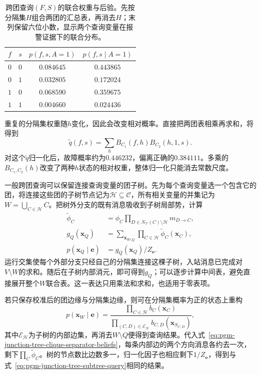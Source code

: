 \begin{table}[htbp]
  \centering
  \begin{tabular}{cccc}
    \toprule
    $f$ & $s$ & $p(f,s,A=1)$ & $p(f,s\mid A=1)$\\
    \midrule
    $0$ & $0$ & $0.084645$ & $0.443865$\\
    $0$ & $1$ & $0.032805$ & $0.172024$\\
    $1$ & $0$ & $0.068590$ & $0.359675$\\
    $1$ & $1$ & $0.004660$ & $0.024436$\\
    \bottomrule
  \end{tabular}
  \caption{跨团查询$(F,S)$的联合权重与后验。先按分隔集$H$组合两团的汇总表，再消去$H$；末列保留六位小数，显示两个查询变量在报警证据下的联合分布。}
  \label{tab:pgm-junction-tree-cross-query}
\end{table}

重复的分隔集权重随$h$变化，因此会改变相对概率。直接把两团表相乘再求和，将得到
\[
  \widetilde{q}(f,s)=\sum_h B_{C_1}(f,h)B_{C_2}(h,1,s).
\]
对这个$\widetilde q$归一化后，故障概率约为$0.446232$，偏离正确的$0.384111$。多乘的$B_{C_1,C_2}(h)$改变了两种$h$状态的相对权重，整体归一化只能消去常数尺度。

一般跨团查询可以保留连接查询变量的团子树。先为每个查询变量选一个包含它的团，将连接这些团的子树节点记为$\mathcal H\subseteq\mathcal C$，所有相关变量的并集记为$W=\bigcup_{C\in\mathcal H}C$。把树外分支的既有消息吸收到子树局部势，计算
\begin{equation}
  \begin{aligned}
    \widetilde{\phi}_C
      &=\phi_C
        \prod_{D\in N_{\mathcal{T}}(C)\setminus\mathcal{H}}m_{D\to C},\\
    g_Q(\bm{x}_Q)
      &=\sum_{\bm{x}_{W\setminus Q}}
         \prod_{C\in\mathcal{H}}\widetilde{\phi}_C(\bm{x}_C),\\
    p(\bm{x}_Q\mid\bm{e})&=g_Q(\bm{x}_Q)/Z_{\bm{e}}.
  \end{aligned}
  \label{eq:pgm-junction-tree-subtree-query}
\end{equation}
运行交集使每个外部分支只经自己的分隔集连接这棵子树，入站消息已完成对$V\setminus W$的求和。随后在子树内部消元，即可得到$g_Q$；可以逐步计算中间表，避免直接展开整个$W$联合表。这一表达只用乘法和求和，也适用于零表项。

若只保存校准后的团边缘与分隔集边缘，则可在分隔集概率为正的状态上重构
\begin{equation}
  p(\bm{x}_W\mid\bm{e})
    =\frac{\prod_{C\in\mathcal{H}}b_C(\bm{x}_C)}
           {\prod_{(C,D)\in\mathcal{E}_{\mathcal{H}}}
                b_{C,D}(\bm{x}_{S_{C,D}})},
  \label{eq:pgm-junction-tree-calibrated-factorization}
\end{equation}
其中$\mathcal E_{\mathcal H}$为子树的内部边集，再消去$W\setminus Q$便得到查询结果。代入式~\eqref{eq:pgm-junction-tree-clique-separator-beliefs}，每条内部边的两个方向消息各约去一次，剩下$\prod_C\widetilde\phi_C$。树的节点数比边数多一，归一化因子也相应剩下$1/Z_{\bm e}$，得到与式~\eqref{eq:pgm-junction-tree-subtree-query}相同的结果。

